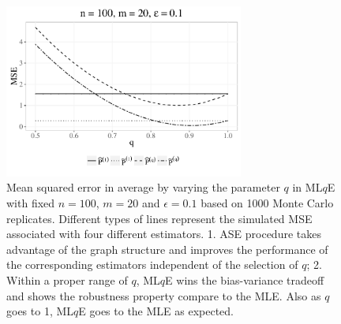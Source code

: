 \documentclass[simplex.tex]{subfiles}
\begin{document}
\begin{figure}[!htb]
\centering
\includegraphics[width=0.7\textwidth]{../../figs/sim_q.pdf}
\caption{Mean squared error in average by varying the parameter $q$ in ML$q$E with fixed $n = 100$, $m = 20$ and $\epsilon = 0.1$ based on 1000 Monte Carlo replicates. Different types of lines represent the simulated MSE associated with four different estimators.
1. ASE procedure takes advantage of the graph structure and improves the performance of the corresponding estimators independent of the selection of $q$;
2. Within a proper range of $q$, ML$q$E wins the bias-variance tradeoff and shows the robustness property compare to the MLE. Also as $q$ goes to 1, ML$q$E goes to the MLE as expected.}
\label{fig:q}
\end{figure}

\clearpage
\end{document}

